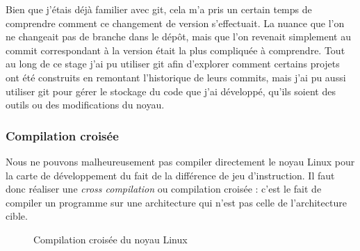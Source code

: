 Bien que j'étais déjà familier avec git, cela m'a pris un certain temps de comprendre comment ce changement de version s'effectuait. La nuance que l'on ne changeait pas de branche dans le dépôt, mais que l'on revenait simplement au commit correspondant à la version était la plus compliquée à comprendre. Tout au long de ce stage j'ai pu utiliser \gls{git} afin d'explorer comment certains projets ont été construits en remontant l'historique de leurs commits, mais j'ai pu aussi utiliser \gls{git} pour gérer le stockage du code que j'ai développé, qu'ils soient des outils ou des modifications du noyau.  


\subsubsection{Compilation croisée}

Nous ne pouvons malheureusement pas compiler directement le noyau Linux pour la carte de développement du fait de la différence de jeu d'instruction. Il faut donc réaliser une \textit{cross compilation} ou compilation croisée : c'est le fait de compiler un programme sur une architecture qui n'est pas celle de l'architecture cible.

\begin{figure}[H]
    \centering

    \caption{Compilation croisée du noyau Linux}

\end{figure}

